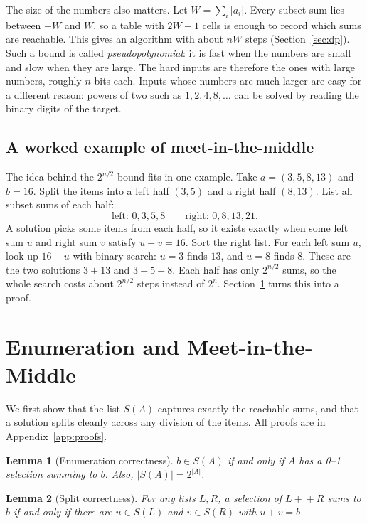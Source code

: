 \documentclass[conference]{IEEEtran}
\newtheorem{lemma}{Lemma}
\begin{document}
The size of the numbers also matters. Let $W=\sum_i|a_i|$. Every subset sum
lies between $-W$ and $W$, so a table with $2W+1$ cells is enough to record
which sums are reachable. This gives an algorithm with about $nW$ steps
(Section~\ref{sec:dp}). Such a bound is called \emph{pseudopolynomial}: it is
fast when the numbers are small and slow when they are large. The hard inputs
are therefore the ones with large numbers, roughly $n$ bits each. Inputs whose
numbers are much larger are easy for a different reason: powers of two such as
$1,2,4,8,\dots$ can be solved by reading the binary digits of the target.

\subsection{A worked example of meet-in-the-middle}
The idea behind the $2^{n/2}$ bound fits in one example. Take
$a=(3,5,8,13)$ and $b=16$. Split the items into a left half $(3,5)$ and a right
half $(8,13)$. List all subset sums of each half:
\[
\text{left: } 0,3,5,8 \qquad \text{right: } 0,8,13,21.
\]
A solution picks some items from each half, so it exists exactly when some left
sum $u$ and right sum $v$ satisfy $u+v=16$. Sort the right list. For each left
sum $u$, look up $16-u$ with binary search: $u=3$ finds $13$, and $u=8$ finds
$8$. These are the two solutions $3+13$ and $3+5+8$. Each half has only
$2^{n/2}$ sums, so the whole search costs about $2^{n/2}$ steps instead of
$2^n$. Section~\ref{sec:mitm} turns this into a proof.

\section{Enumeration and Meet-in-the-Middle}\label{sec:mitm}
We first show that the list $S(A)$ captures exactly the reachable sums, and
that a solution splits cleanly across any division of the items. All proofs
are in Appendix~\ref{app:proofs}.

\begin{lemma}[Enumeration correctness]\label{lem:enum}
$b\in S(A)$ if and only if $A$ has a 0--1 selection summing to $b$.
Also, $|S(A)|=2^{|A|}$.
\end{lemma}

\begin{lemma}[Split correctness]\label{lem:split}
For any lists $L,R$, a selection of $L+\!+R$ sums to $b$ if and only if there
are $u\in S(L)$ and $v\in S(R)$ with $u+v=b$.
\end{lemma}
\end{document}
